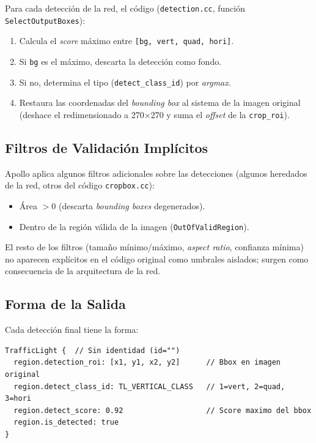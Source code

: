 Para cada detección de la red, el código (\texttt{detection.cc}, función \texttt{SelectOutputBoxes}):

\begin{enumerate}
    \item Calcula el \textit{score} máximo entre \texttt{[bg, vert, quad, hori]}.
    \item Si \texttt{bg} es el máximo, descarta la detección como fondo.
    \item Si no, determina el tipo (\texttt{detect\_class\_id}) por \textit{argmax}.
    \item Restaura las coordenadas del \textit{bounding box} al sistema de la imagen original (deshace el redimensionado a 270$\times$270 y suma el \textit{offset} de la \texttt{crop\_roi}).
\end{enumerate}

\subsection{Filtros de Validación Implícitos}

Apollo aplica algunos filtros adicionales sobre las detecciones (algunos heredados de la red, otros del código \texttt{cropbox.cc}):

\begin{itemize}
    \item Área $> 0$ (descarta \textit{bounding boxes} degenerados).
    \item Dentro de la región válida de la imagen (\texttt{OutOfValidRegion}).
\end{itemize}

El resto de los filtros (tamaño mínimo/máximo, \textit{aspect ratio}, confianza mínima) no aparecen explícitos en el código original como umbrales aislados; surgen como consecuencia de la arquitectura de la red.

\subsection{Forma de la Salida}

Cada detección final tiene la forma:

\begin{codesnippet}
\begin{verbatim}
TrafficLight {  // Sin identidad (id="")
  region.detection_roi: [x1, y1, x2, y2]      // Bbox en imagen original
  region.detect_class_id: TL_VERTICAL_CLASS   // 1=vert, 2=quad, 3=hori
  region.detect_score: 0.92                   // Score maximo del bbox
  region.is_detected: true
}
\end{verbatim}
\end{codesnippet}

